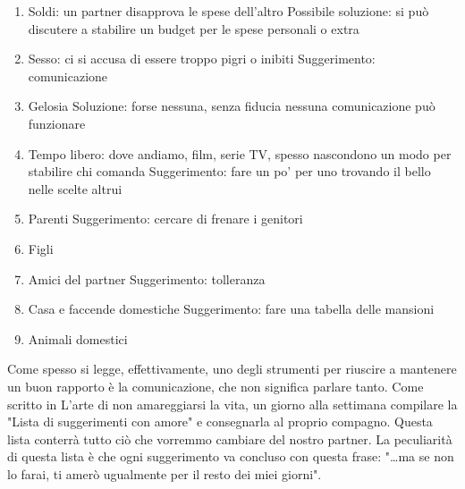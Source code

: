 \documentclass[12pt]{book} %
\begin{document}
\begin{enumerate}
\item Soldi: un partner disapprova le spese dell'altro\newline
Possibile soluzione: si può discutere a stabilire un budget per le spese personali o extra
\item Sesso: ci si accusa di essere troppo pigri o inibiti \newline
Suggerimento: comunicazione
\item Gelosia\newline
Soluzione: forse nessuna, senza fiducia nessuna comunicazione può funzionare
\item Tempo libero: dove andiamo, film, serie TV, spesso nascondono un modo per stabilire chi comanda \newline
Suggerimento: fare un po' per uno trovando il bello nelle scelte altrui
\item Parenti \newline
Suggerimento: cercare di frenare i genitori
\item Figli
\item Amici del partner \newline
Suggerimento: tolleranza
\item Casa e faccende domestiche \newline
Suggerimento: fare una tabella delle mansioni
\item Animali domestici
\end{enumerate}
Come spesso si legge, effettivamente, uno degli strumenti per riuscire a mantenere un buon rapporto è la comunicazione,
che non significa parlare tanto. Come scritto in L'arte di non amareggiarsi la
vita, un giorno alla settimana compilare la "Lista
di suggerimenti con amore" e consegnarla al proprio compagno. Questa lista conterrà tutto ciò che
vorremmo cambiare del nostro partner. La peculiarità di questa lista è che ogni suggerimento va concluso con questa
frase: "…ma se non lo farai, ti amerò ugualmente per il resto dei miei
giorni". 
\end{document}
